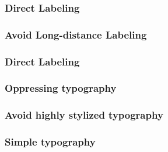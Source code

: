 \documentclass[12pt]{beamer}\usepackage[]{graphicx}\usepackage[]{color}
\begin{document}

\begin{frame}
\frametitle{Direct Labeling}
\begin{center}
\end{center}
\end{frame}


\begin{frame}
\frametitle{Avoid Long-distance Labeling}
\begin{center}
\end{center}
\end{frame}


\begin{frame}
\frametitle{Direct Labeling}
\begin{center}
\end{center}
\end{frame}


\begin{frame}
\begin{center}
\Huge{}
\end{center}
\end{frame}


\begin{frame}
\frametitle{Oppressing typography}
\begin{center}
\end{center}
\end{frame}


\begin{frame}
\frametitle{Avoid highly stylized typography}
\begin{center}
\end{center}
\end{frame}


\begin{frame}
\frametitle{Simple typography}
\begin{center}
\end{center}
\end{frame}

\end{document}
